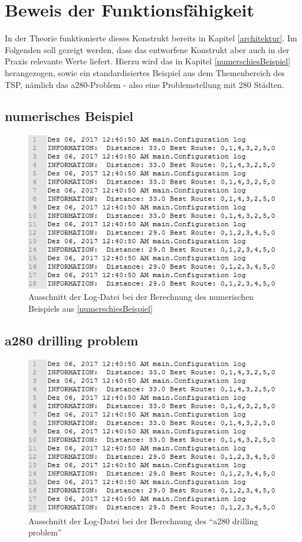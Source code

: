 \section{Beweis der Funktionsfähigkeit}
In der Theorie funktionierte dieses Konstrukt bereits in Kapitel \ref{architektur}. Im Folgenden soll gezeigt werden, dass das entworfene Konstrukt aber auch in der Praxis relevante Werte liefert. Hierzu wird das in Kapitel \ref{numerschiesBeispiel} herangezogen, sowie ein standardisiertes Beispiel aus dem Themenbereich des \ac{TSP}, nämlich das a280-Problem - also eine Problemstellung mit 280 Städten.

\subsection{numerisches Beispiel}

\begin{figure}[h]
	\centering
	\includegraphics[width=0.6\linewidth]{images/numerischErgebnis.png}
	\caption{Ausschnitt der Log-Datei bei der Berechnung des numerischen Beispiels aus \ref{numerschiesBeispiel}}
	\label{numerischBeweis}
\end{figure}

\subsection{a280 drilling problem}

\begin{figure}[h]
	\centering
	\includegraphics[width=0.6\linewidth]{images/numerischErgebnis.png}
	\caption{Ausschnitt der Log-Datei bei der Berechnung des ``a280 drilling problem''}
	\label{drillingBeweis}
\end{figure}